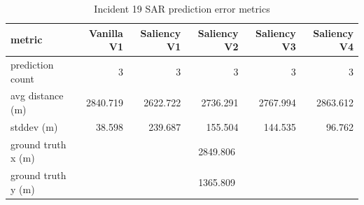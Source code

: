 \begin{table}[ht]
\centering
\caption{Incident 19 SAR prediction error metrics}
\label{tab:sar-incident-19}
\begin{tabular}{lrrrrr}
\hline
metric & Vanilla V1 & Saliency V1 & Saliency V2 & Saliency V3 & Saliency V4 \\
\hline
prediction count & 3 & 3 & 3 & 3 & 3 \\
avg distance (m) & 2840.719 & 2622.722 & 2736.291 & 2767.994 & 2863.612 \\
stddev (m) & 38.598 & 239.687 & 155.504 & 144.535 & 96.762 \\
ground truth x (m) & \multicolumn{5}{c}{2849.806} \\
ground truth y (m) & \multicolumn{5}{c}{1365.809} \\
\hline
\end{tabular}
\end{table}
